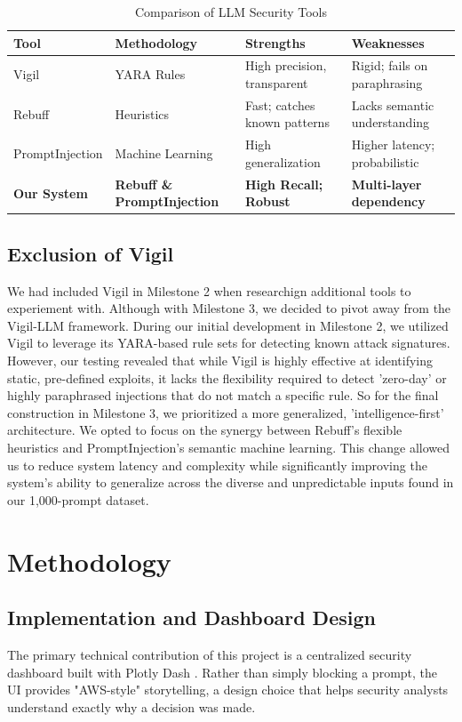 \documentclass{article}
\begin{document}
\begin{table}[ht]
\caption{Comparison of LLM Security Tools}
\centering
\begin{tabular}{llll}
\toprule
\textbf{Tool} & \textbf{Methodology} & \textbf{Strengths} & \textbf{Weaknesses} \\
\midrule
Vigil & YARA Rules & High precision, transparent & Rigid; fails on paraphrasing \\
Rebuff & Heuristics & Fast; catches known patterns & Lacks semantic understanding \\
PromptInjection & Machine Learning & High generalization & Higher latency; probabilistic \\
\textbf{Our System} & \textbf{Rebuff \& PromptInjection} & \textbf{High Recall; Robust} & \textbf{Multi-layer dependency} \\
\bottomrule
\end{tabular}
\label{tab:comparison}
\end{table}


\subsection{Exclusion of Vigil}
We had included Vigil in Milestone 2 when researchign additional tools to experiement with. Although with Milestone 3, we decided to pivot away from the Vigil-LLM framework. During our initial development in Milestone 2, we utilized Vigil to leverage its YARA-based rule sets for detecting known attack signatures. However, our testing revealed that while Vigil is highly effective at identifying static, pre-defined exploits, it lacks the flexibility required to detect 'zero-day' or highly paraphrased injections that do not match a specific rule. So for the final construction in Milestone 3, we prioritized a more generalized, 'intelligence-first' architecture. We opted to focus on the synergy between Rebuff’s flexible heuristics and PromptInjection’s semantic machine learning. This change allowed us to reduce system latency and complexity while significantly improving the system's ability to generalize across the diverse and unpredictable inputs found in our 1,000-prompt dataset.
\section{Methodology}


\subsection{Implementation and Dashboard Design}
The primary technical contribution of this project is a centralized security dashboard built with Plotly Dash \cite{dash_viz}. Rather than simply blocking a prompt, the UI provides "AWS-style" storytelling, a design choice that helps security analysts understand exactly why a decision was made. 
\end{document}
